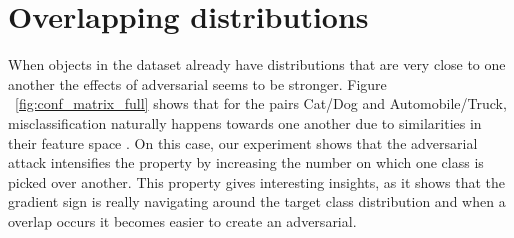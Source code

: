 \section{Overlapping distributions}
When objects in the dataset already have distributions that are very close to one another the effects of adversarial seems to be stronger. Figure ~\ref{fig:conf_matrix_full} shows that for the pairs Cat/Dog and Automobile/Truck, misclassification naturally happens towards one another due to similarities in their feature space \cite{stanford2016}. On this case, our experiment shows that the adversarial attack intensifies the property by increasing the number on which one class is picked over another. This property gives interesting insights, as it shows that the gradient sign is really navigating around the target class distribution and when a overlap occurs it becomes easier to create an adversarial.

